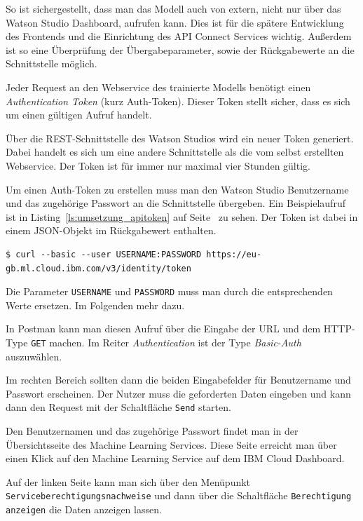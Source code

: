 So ist sichergestellt, dass man das Modell auch von extern, nicht nur über das Watson Studio Dashboard, aufrufen kann.
Dies ist für die spätere Entwicklung des Frontends und die Einrichtung des API Connect Services wichtig. Außerdem ist
so eine Überprüfung der Übergabeparameter, sowie der Rückgabewerte an die Schnittstelle möglich.

Jeder Request an den Webservice des trainierte Modells benötigt einen \textit{Authentication Token} (kurz Auth-Token).
Dieser Token stellt sicher, dass es sich um einen gültigen Aufruf handelt.

Über die REST-Schnittstelle des Watson Studios wird ein neuer Token generiert. Dabei handelt es sich um eine andere
Schnittstelle als die vom selbst erstellten Webservice. Der Token ist für immer nur maximal vier Stunden gültig.

Um einen Auth-Token zu erstellen muss man den Watson Studio Benutzername und das zugehörige Passwort an die
Schnittstelle übergeben. Ein Beispielaufruf ist in Listing~\ref{ls:umsetzung_apitoken} auf
Seite~\pageref{ls:umsetzung_apitoken} zu sehen. Der Token ist dabei in einem JSON-Objekt im Rückgabewert enthalten.

\begin{lstlisting}[caption=Abruf des Auth-Tokens, label=ls:umsetzung_apitoken]
$ curl --basic --user USERNAME:PASSWORD https://eu-gb.ml.cloud.ibm.com/v3/identity/token
\end{lstlisting}

Die Parameter \texttt{USERNAME} und \texttt{PASSWORD} muss man durch die entsprechenden Werte ersetzen. Im Folgenden
mehr dazu.

In Postman kann man diesen Aufruf über die Eingabe der URL und dem HTTP-Type \texttt{GET} machen. Im Reiter
\textit{Authentication} ist der Type \textit{Basic-Auth} auszuwählen.

Im rechten Bereich sollten dann die beiden Eingabefelder für Benutzername und Passwort erscheinen. Der Nutzer muss die
geforderten Daten eingeben und kann dann den Request mit der Schaltfläche \texttt{Send} starten.

Den Benutzernamen und das zugehörige Passwort findet man in der Übersichtsseite des Machine Learning Services. Diese
Seite erreicht man über einen Klick auf den Machine Learning Service auf dem IBM Cloud Dashboard.

Auf der linken Seite kann man sich über den Menüpunkt \texttt{Service\-berechtigungs\-nachweise} und dann über die
Schaltfläche \texttt{Berechtigung anzeigen} die Daten anzeigen lassen.

